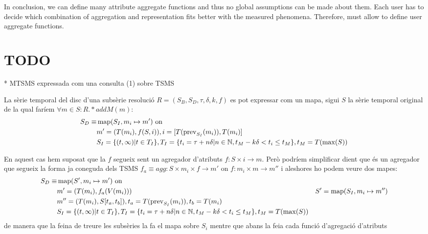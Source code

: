 In conclusion, we can define many attribute aggregate functions and
thus no global assumptions can be made about them. Each user has to
decide which combination of aggregation and representation fits better
with the measured phenomena.  Therefore,  must allow to
define user aggregate functions.










\todo{}


\section{TODO}


* MTSMS expressada com una consulta (1) sobre TSMS

La sèrie temporal del disc d'una subsèrie resolució $R=(S_B,S_D,\tau,\delta,k,f)$ es pot expressar com un mapa, sigui $S$ la sèrie temporal original de la qual faríem $\forall m \in S: R.*addM(m)$: 
  \begin{align*}
    S_D \equiv &  \operatorname{map}(S_I, m_i\mapsto m') \text{ on }  \\
    & m' = (T(m_i), f(S, i)), i = [T(\operatorname{prev}_{S_I}(m_i)),T(m_i)] \\
    &  S_I = \{ (t,\infty) | t\in T_I  \}, T_I = \{ t_i = \tau+n\delta | n\in\mathbb{N}, t_M - k\delta < t_i \leq t_M \}, t_M = T(\max(S))
  \end{align*}
  
En aquest cas hem suposat que la $f$ segueix sent un agregador d'atributs $f:S\times i\rightarrow m$. Però podríem simplificar dient que és un agregador que segueix la forma ja coneguda dels TSMS $f_a \equiv agg:S\times m_i \times f \rightarrow m'$ on $f:m_i\times m\rightarrow m''$ i aleshores ho podem veure dos mapes:
  \begin{align*}
    S_D \equiv &  \operatorname{map}(S', m_i\mapsto m') \text{ on }  \\
    & m' = (T(m_i), f_a(V(m_i)))
    & S' = \operatorname{map}(S_I, m_i\mapsto m'') \\
    & m'' = (T(m_i), S[t_a,t_b]), t_a = T(\operatorname{prev}_{S_I}(m_i)), t_b=T(m_i) \\
    &  S_I = \{ (t,\infty) | t\in T_I  \}, T_I = \{ t_i = \tau+n\delta | n\in\mathbb{N}, t_M - k\delta < t_i \leq t_M \}, t_M = T(\max(S))
  \end{align*}
de manera que la feina de treure les subsèries la fa el mapa sobre $S_i$ mentre que abans la feia cada funció d'agregació d'atributs



